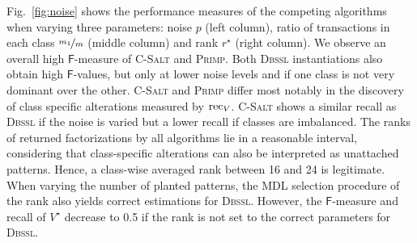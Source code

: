 Fig.~\ref{fig:noise} shows the performance measures of the competing algorithms when varying three parameters: noise $p$ (left column), ratio of transactions in each class $\nicefrac{m_1}{m}$ (middle column) and rank $r^\star$ (right column).
We observe an overall high $\mathsf{F}$-measure of \textsc{C-Salt} and \textsc{Primp}.
Both \textsc{Dbssl} instantiations also obtain high $\mathsf{F}$-values, but only at lower noise levels and if one class is not very dominant over the other.
\textsc{C-Salt} and \textsc{Primp} differ most notably in the discovery of class specific alterations measured by $\operatorname{rec}_V$. \textsc{C-Salt} shows a similar recall as \textsc{Dbssl} if the noise is varied but a lower recall if classes are imbalanced. The ranks of returned factorizations by all algorithms lie in a reasonable interval, considering that class-specific alterations can also be interpreted as unattached patterns. Hence, a class-wise averaged rank between 16 and 24 is legitimate. When varying the number of planted patterns, the MDL selection procedure of the rank also yields correct estimations for \textsc{Dbssl}. However, the $\mathsf{F}$-measure and recall of $V^\star$ decrease to 0.5 if the rank is not set to the correct parameters for \textsc{Dbssl}.

